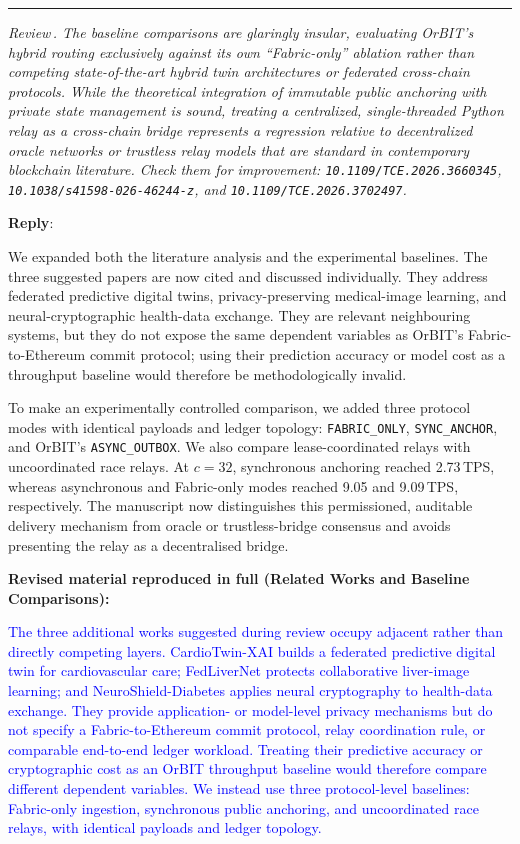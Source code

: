 \documentclass[11pt]{article}
\newcounter{reviewer}
\newcounter{point}[reviewer]
\renewcommand{\thepoint}{Review\,\thereviewer.\arabic{point}}
\newcommand{\point}[1]{\refstepcounter{point}  \bigskip \hrule \medskip \noindent \textit{{\fontseries{b}\selectfont \thepoint } #1}\par}
\newcommand{\reply}{\medskip \noindent \textbf{Reply}:\ }
\begin{document}
\point{The baseline comparisons are glaringly insular, evaluating OrBIT's
hybrid routing exclusively against its own ``Fabric-only'' ablation rather than
competing state-of-the-art hybrid twin architectures or federated cross-chain
protocols. While the theoretical integration of immutable public anchoring with
private state management is sound, treating a centralized, single-threaded
Python relay as a cross-chain bridge represents a regression relative to
decentralized oracle networks or trustless relay models that are standard in
contemporary blockchain literature. Check them for improvement:
\nolinkurl{10.1109/TCE.2026.3660345},
\nolinkurl{10.1038/s41598-026-46244-z}, and
\nolinkurl{10.1109/TCE.2026.3702497}.}

\reply{We expanded both the literature analysis and the experimental baselines.
The three suggested papers are now cited and discussed individually. They address
federated predictive digital twins, privacy-preserving medical-image learning,
and neural-cryptographic health-data exchange. They are relevant neighbouring
systems, but they do not expose the same dependent variables as OrBIT's
Fabric-to-Ethereum commit protocol; using their prediction accuracy or model
cost as a throughput baseline would therefore be methodologically invalid.

To make an experimentally controlled comparison, we added three protocol modes
with identical payloads and ledger topology: \texttt{FABRIC\_ONLY},
\texttt{SYNC\_ANCHOR}, and OrBIT's \texttt{ASYNC\_OUTBOX}. We also compare
lease-coordinated relays with uncoordinated race relays. At $c=32$, synchronous
anchoring reached 2.73\,TPS, whereas asynchronous and Fabric-only modes reached
9.05 and 9.09\,TPS, respectively. The manuscript now distinguishes this
permissioned, auditable delivery mechanism from oracle or trustless-bridge
consensus and avoids presenting the relay as a decentralised bridge.}

\medskip
\noindent\textbf{Revised material reproduced in full (Related Works and Baseline Comparisons):}

\textcolor{blue}{The three additional works suggested during review occupy adjacent rather than directly competing layers. CardioTwin-XAI builds a federated predictive digital twin for cardiovascular care; FedLiverNet protects collaborative liver-image learning; and NeuroShield-Diabetes applies neural cryptography to health-data exchange. They provide application- or model-level privacy mechanisms but do not specify a Fabric-to-Ethereum commit protocol, relay coordination rule, or comparable end-to-end ledger workload. Treating their predictive accuracy or cryptographic cost as an OrBIT throughput baseline would therefore compare different dependent variables. We instead use three protocol-level baselines: Fabric-only ingestion, synchronous public anchoring, and uncoordinated race relays, with identical payloads and ledger topology.}
\end{document}
